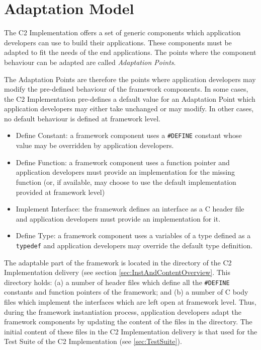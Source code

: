 \documentclass{pnp_article}
\begin{document}
\section{Adaptation Model}\label{sec:AdaptationModel}
The C2 Implementation offers a set of generic components which application developers can use to build their applications. These components must be adapted to fit the needs of the end applications. The points where the component behaviour can be adapted are called \textit{Adaptation Points}.

The Adaptation Points are therefore the points where application developers may modify the pre-defined behaviour of the framework components. In some cases, the C2 Implementation pre-defines a default value for an Adaptation Point which application developers may either take unchanged or may modify. In other cases, no default behaviour is defined at framework level. 


\begin{itemize}
\item Define Constant: a framework component uses a \texttt{\#DEFINE} constant whose value may be overridden by application developers.
\item Define Function: a framework component uses a function pointer and application developers must provide an implementation for the missing function (or, if available, may choose to use the default implementation provided at framework level)
\item Implement Interface: the framework defines an interface as a C header file and application developers must provide an implementation for it.
\item Define Type: a framework component uses a variables of a type defined as a \texttt{typedef} and application developers may override the default type definition.
\end{itemize}

The adaptable part of the framework is located in the  directory of the C2 Implementation delivery (see section \ref{sec:InstAndContentOverview}. This directory holds: (a) a number of header files which define all the \texttt{\#DEFINE} constants and function pointers of the framework; and (b) a number of C body files which implement the interfaces which are left open at framework level. Thus, during the framework instantiation process, application developers adapt the framework components by updating the content of the files in the  directory. The initial content of these files in the C2 Implementation delivery is that used for the Test Suite of the C2 Implementation (see \ref{sec:TestSuite}). 
\end{document}
